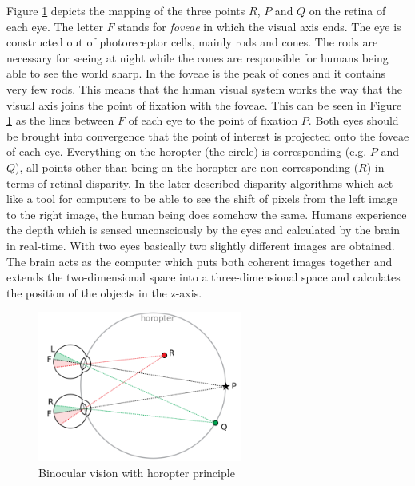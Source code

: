 \noindent Figure \ref{fig:horopter} depicts the mapping of the three points $R$, $P$ and $Q$ on the retina of each eye.
The letter $F$ stands for \textit{foveae} in which the visual axis ends.
The eye is constructed out of photoreceptor cells, mainly rods and cones.
The rods are necessary for seeing at night while the cones are responsible for humans being able to see the world sharp.
In the foveae is the peak of cones and it contains very few rods.
This means that the human visual system works the way that the visual axis joins the point of fixation with the foveae.
This can be seen in Figure \ref{fig:horopter} as the lines between $F$ of each eye to the point of fixation $P$.
Both eyes should be brought into convergence that the point of interest is projected onto the foveae of each eye.
Everything on the horopter (the circle) is corresponding (e.g. $P$ and $Q$), all points other than being on the horopter are non-corresponding ($R$) in terms of retinal disparity.
\newline\newline\noindent In the later described disparity algorithms which act like a tool for computers to be able to see the shift of pixels from the left image to the right image, the human being does somehow the same.
Humans experience the depth which is sensed unconsciously by the eyes and calculated by the brain in real-time.
With two eyes basically two slightly different images are obtained.
The brain acts as the computer which puts both coherent images together and extends the two-dimensional space into a three-dimensional space and calculates the position of the objects in the z-axis.

\begin{figure}[h!]
  \centering
  \includegraphics[width=0.6\textwidth]{src/images/horopter.png}
  \caption[Binocular vision with horopter principle]{Binocular vision with horopter principle\protect\footnotemark}
  \label{fig:horopter}
\end{figure}

